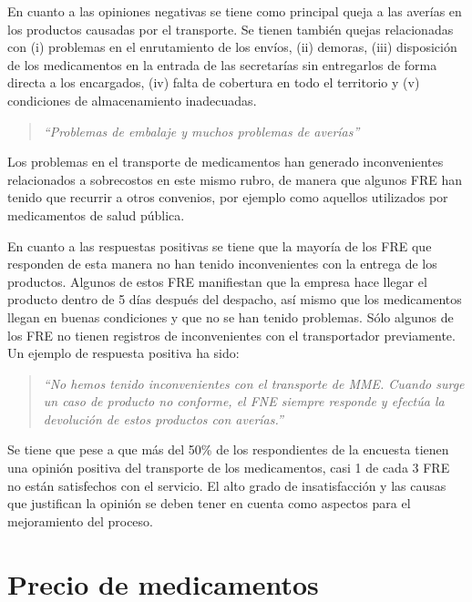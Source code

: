 \documentclass[
]{book}
\begin{document}
En cuanto a las opiniones negativas se tiene como principal queja a las averías en los productos causadas por el transporte. Se tienen también quejas relacionadas con (i) problemas en el enrutamiento de los envíos, (ii) demoras, (iii) disposición de los medicamentos en la entrada de las secretarías sin entregarlos de forma directa a los encargados, (iv) falta de cobertura en todo el territorio y (v) condiciones de almacenamiento inadecuadas.

\begin{quote}
\emph{``Problemas de embalaje y muchos problemas de averías''}
\end{quote}

Los problemas en el transporte de medicamentos han generado inconvenientes relacionados a sobrecostos en este mismo rubro, de manera que algunos FRE han tenido que recurrir a otros convenios, por ejemplo como aquellos utilizados por medicamentos de salud pública.

En cuanto a las respuestas positivas se tiene que la mayoría de los FRE que responden de esta manera no han tenido inconvenientes con la entrega de los productos. Algunos de estos FRE manifiestan que la empresa hace llegar el producto dentro de 5 días después del despacho, así mismo que los medicamentos llegan en buenas condiciones y que no se han tenido problemas. Sólo algunos de los FRE no tienen registros de inconvenientes con el transportador previamente. Un ejemplo de respuesta positiva ha sido:

\begin{quote}
\emph{``No hemos tenido inconvenientes con el transporte de MME. Cuando surge un caso de producto no conforme, el FNE siempre responde y efectúa la devolución de estos productos con averías.''}
\end{quote}

Se tiene que pese a que más del 50\% de los respondientes de la encuesta tienen una opinión positiva del transporte de los medicamentos, casi 1 de cada 3 FRE no están satisfechos con el servicio. El alto grado de insatisfacción y las causas que justifican la opinión se deben tener en cuenta como aspectos para el mejoramiento del proceso.

\hypertarget{precio-de-medicamentos}{%
\section{Precio de medicamentos}\label{precio-de-medicamentos}}

\end{document}
